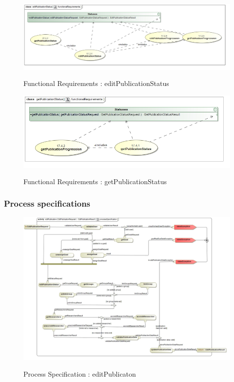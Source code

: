 \documentclass{article}
\begin{document}
		\begin{figure}[H]
		\includegraphics[width=\textwidth]{Quinton_Diagrams/class__editPublicationStatus__functionalRequirements.jpg}  \\
		\caption{Functional Requirements : editPublicationStatus}
		\end{figure}
		
		\begin{figure}[H]
		\includegraphics[width=\textwidth]{Quinton_Diagrams/class__getPublicationStatus__functionalRequirements.jpg}  \\
		\caption{Functional Requirements : getPublicationStatus}
		\end{figure}
		

	\subsubsection{Process specifications}
		\begin{figure}[H]
		\includegraphics[width=\textwidth]{Quinton_Diagrams/act__editPublication__processSpecification.jpg}  \\
		\caption{Process Specification : editPublicaton}
		\end{figure}
		
\end{document}
